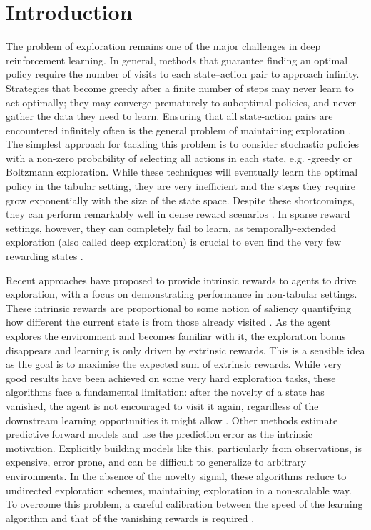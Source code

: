 \documentclass{article} \usepackage{iclr2020_conference,times}
\begin{document}
\section{Introduction}
\label{intro}
The problem of exploration remains one of the major challenges in deep reinforcement learning.  In general, methods that guarantee finding an optimal policy require the number of visits to each state–action pair to approach infinity. Strategies that become greedy after a finite number of steps may never learn to act optimally; they may converge prematurely to suboptimal policies, and never gather the data they need to learn. Ensuring that all state-action pairs are encountered infinitely often is the general problem of maintaining exploration \citep{franccois2018introduction,sutton2018reinforcement}. 
The simplest approach for tackling this problem is to consider stochastic policies with a non-zero probability of selecting all actions in each state, e.g. -greedy or Boltzmann exploration. While these techniques will eventually learn the optimal policy in the tabular setting, they are very inefficient and the steps they require grow exponentially with the size of the state space. Despite these shortcomings, they can perform remarkably well in dense reward scenarios \citep{mnih2015human}. In sparse reward settings, however, they can completely fail to learn, as temporally-extended exploration (also called deep exploration) is crucial to even find the very few rewarding states \citep{osband2016deep}.

Recent approaches have proposed to provide intrinsic rewards to agents to drive exploration, with a focus on demonstrating performance in non-tabular settings. These intrinsic rewards are proportional to some notion of saliency quantifying how different the current state is from those already visited \citep{bellemare2016unifying, haber2018learning,houthooft2016vime,oh2015action,ostrovski2017count,pathak2017curiosity,stadie2015incentivizing}. 
As the agent explores the environment and becomes familiar with it, the exploration bonus disappears and learning is only driven by extrinsic rewards. This is a sensible idea as the goal is to maximise the expected sum of extrinsic rewards. While very good results have been achieved on some very hard exploration tasks, these algorithms face a fundamental limitation: after the novelty of a state has vanished, the agent is not encouraged to visit it again, regardless of the downstream learning opportunities it might allow \citep{bellemare2016unifying, ecoffet2019go, stanton2018deep}.
Other methods estimate predictive forward models \citep{haber2018learning,houthooft2016vime,oh2015action,pathak2017curiosity,stadie2015incentivizing} and use the prediction error as the intrinsic motivation.
Explicitly building models like this, particularly from observations, is expensive, error prone, and can be difficult to generalize to arbitrary environments.
In the absence of the novelty signal, these algorithms reduce to undirected exploration schemes, maintaining exploration in a non-scalable way. To overcome this problem, a careful calibration between the speed of the learning algorithm and that of the vanishing rewards is required \citep{ecoffet2019go,ostrovski2017count}.
\end{document}
